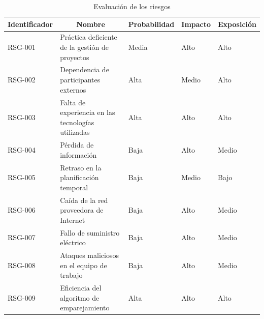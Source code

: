 \begin{table}[htpb]
\centering
\begin{tabularx}{\textwidth}{|l|X|l|l|l|}
\hline
\multicolumn{1}{|c|}{\textbf{Identificador}} & \multicolumn{1}{c|}{\textbf{Nombre}}                        & \multicolumn{1}{c|}{\textbf{Probabilidad}} & \multicolumn{1}{c|}{\textbf{Impacto}} & \multicolumn{1}{c|}{\textbf{Exposición}} \\ \hline
RSG-001                             & Práctica deficiente de la gestión de proyectos     & Media                             & Alto                         & Alto                            \\ \hline
RSG-002                             & Dependencia de participantes externos              & Alta                              & Medio                        & Alto                            \\ \hline
RSG-003                             & Falta de experiencia en las tecnologías utilizadas & Alta                              & Alto                         & Alto                            \\ \hline
RSG-004                             & Pérdida de información                             & Baja                              & Alto                         & Medio                           \\ \hline
RSG-005                             & Retraso en la planificación temporal               & Baja                              & Medio                        & Bajo                            \\ \hline
RSG-006                             & Caída de la red proveedora de Internet             & Baja                              & Alto                         & Medio                           \\ \hline
RSG-007                             & Fallo de suministro eléctrico                      & Baja                              & Alto                         & Medio                           \\ \hline
RSG-008                             & Ataques maliciosos en el equipo de trabajo         & Baja                              & Alto                         & Medio                           \\ \hline
RSG-009                             & Eficiencia del algoritmo de emparejamiento         & Alta                              & Alto                         & Alto                           \\ \hline
\end{tabularx}
\caption{Evaluación de los riesgos}
\label{tab_eval_riesgos}
\end{table}

